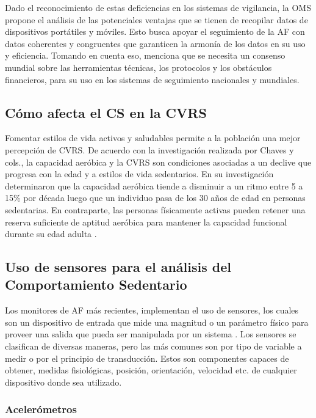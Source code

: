 Dado el reconocimiento de estas deficiencias en los sistemas de vigilancia, la OMS propone el análisis de las potenciales ventajas que se tienen de recopilar datos de dispositivos portátiles y móviles. Esto busca apoyar el seguimiento de la AF con datos coherentes y congruentes que garanticen la armonía de los datos en su uso y eficiencia. Tomando en cuenta eso, menciona que se necesita un consenso mundial sobre las herramientas técnicas, los protocolos y los obstáculos financieros, para su uso en los sistemas de seguimiento nacionales y mundiales.

\subsection{Cómo afecta el CS en la CVRS}
\label{subsec:cs_afecta_cvrs}

Fomentar estilos de vida activos y saludables permite a la población una mejor percepción de CVRS. De acuerdo con la investigación realizada por Chaves y cols., la capacidad aeróbica y la CVRS son condiciones asociadas a un declive que progresa con la edad y a estilos de vida sedentarios. En su investigación determinaron que la capacidad aeróbica tiende a disminuir a un ritmo entre 5 a 15\% por década luego que un individuo pasa de los 30 años de edad en personas sedentarias. En contraparte, las personas físicamente activas pueden retener una reserva suficiente de aptitud aeróbica para mantener la capacidad funcional durante su edad adulta \citep{Chaves2017Asociacion}.

\subsection{Uso de sensores para el análisis del Comportamiento Sedentario}
\label{subsec:uso_sensores_analisis_cs}

Los monitores de AF más recientes, implementan el uso de sensores, los cuales son un dispositivo de entrada que mide una magnitud o un parámetro físico para proveer una salida que pueda ser manipulada por un sistema \citep{Alvarez2020EnergyExpenditure}. Los sensores se clasifican de diversas maneras, pero las más comunes son por tipo de variable a medir o por el principio de transducción. Estos son componentes capaces de obtener, medidas fisiológicas, posición, orientación, velocidad etc. de cualquier dispositivo donde sea utilizado.

\subsubsection{Acelerómetros}
\label{subsubsec:acelerometros_analisis}

